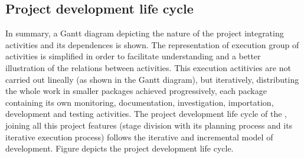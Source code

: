 \documentclass[twocolumn, 9pt]{extarticle}
\begin{document}
\subsection{Project development life cycle}
\label{ssec:project-development-life-cycle}
In summary, a Gantt diagram depicting the nature of the project
integrating activities and its dependences is shown. The
representation of execution group of activities is simplified in
order to facilitate understanding and a better illustration of
the relations between activities. This execution actitivies are not
carried out lineally (as shown in the Gantt diagram), but iteratively,
distributing the whole work in smaller packages achieved
progressively, each package containing its own monitoring,
documentation, investigation, importation, development and testing
activities. The project development life cycle of the \favp, joining
all this project features (stage division with its planning process
and its iterative execution process) follows the iterative and
incremental model of development. Figure 
depicts the project development life cycle.
\end{document}
